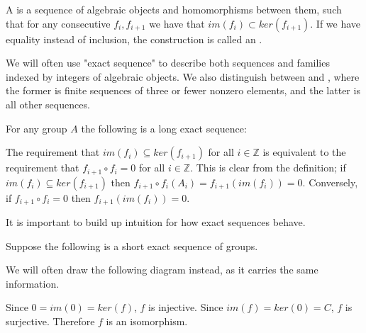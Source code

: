 \begin{definition}
A  is a sequence of algebraic objects and homomorphisms between them, such that for any consecutive $f_{i},f_{i+1}$ we have that $im(f_i)\subset ker(f_{i+1})$. If we have equality instead of inclusion, the construction is called an .
\end{definition}

We will often use "exact sequence" to describe both sequences and families indexed by integers of algebraic objects. We also distinguish between  and , where the former is finite sequences of three or fewer nonzero elements, and the latter is all other sequences.

\begin{example}
For any group $A$ the following is a long exact sequence:
\end{example}

\begin{remark}
The requirement that $im(f_i)\subseteq ker(f_{i+1})$ for all $i\in \mathbb{Z}$ is equivalent to the requirement that $f_{i+1}\circ f_i=0$ for all $i\in \mathbb{Z}$. This is clear from the definition; if $im(f_i)\subseteq ker(f_{i+1})$ then $f_{i+1}\circ f_i (A_i)=f_{i+1}(im(f_i))=0$. Conversely, if $f_{i+1}\circ f_i=0$ then $f_{i+1}(im(f_i))=0$.
\end{remark}

It is important to build up intuition for how exact sequences behave. 

\begin{example}
Suppose the following is a short exact sequence of groups.

We will often draw the following diagram instead, as it carries the same information.
Since $0=im(0)=ker(f)$, $f$ is injective. Since $im(f)=ker(0)=C$, $f$ is surjective. Therefore $f$ is an isomorphism.

\end{example}

